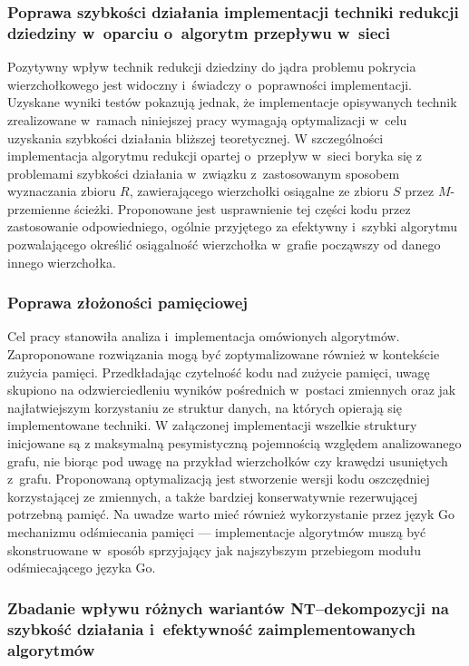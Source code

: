   \subsubsection{\textbf{Poprawa szybkości działania implementacji techniki redukcji dziedziny w~oparciu o~algorytm przepływu w~sieci}}

  Pozytywny wpływ technik redukcji dziedziny do jądra problemu pokrycia wierzchołkowego jest widoczny i~świadczy o~poprawności implementacji.
  Uzyskane wyniki testów pokazują jednak, że implementacje opisywanych technik zrealizowane w~ramach niniejszej pracy wymagają optymalizacji w~celu uzyskania szybkości działania bliższej teoretycznej.
  W szczególności implementacja algorytmu redukcji opartej o~przepływ w~sieci boryka się z problemami szybkości działania w~związku z~zastosowanym sposobem wyznaczania zbioru $R$, zawierającego wierzchołki osiągalne ze zbioru $S$ przez $M$-przemienne ścieżki.
  Proponowane jest usprawnienie tej części kodu przez zastosowanie odpowiedniego, ogólnie przyjętego za efektywny i~szybki algorytmu pozwalającego określić osiągalność wierzchołka w~grafie począwszy od danego innego wierzchołka.

  \subsubsection{\textbf{Poprawa złożoności pamięciowej}}

  Cel pracy stanowiła analiza i~implementacja omówionych algorytmów.
  Zaproponowane rozwiązania mogą być zoptymalizowane również w kontekście zużycia pamięci.
  Przedkładając czytelność kodu nad zużycie pamięci, uwagę skupiono na odzwierciedleniu wyników pośrednich w~postaci zmiennych oraz jak najłatwiejszym korzystaniu ze struktur danych, na których opierają się implementowane techniki.
  W załączonej implementacji wszelkie struktury inicjowane są z maksymalną pesymistyczną pojemnością względem analizowanego grafu, nie biorąc pod uwagę na przykład wierzchołków czy krawędzi usuniętych z~grafu.
  Proponowaną optymalizacją jest stworzenie wersji kodu oszczędniej korzystającej ze zmiennych, a także bardziej konserwatywnie rezerwującej potrzebną pamięć.
  Na uwadze warto mieć również wykorzystanie przez język Go mechanizmu odśmiecania pamięci --- implementacje algorytmów muszą być skonstruowane w~sposób sprzyjający jak najszybszym przebiegom modułu odśmiecającego języka Go.

  \subsubsection{\textbf{Zbadanie wpływu różnych wariantów NT--dekompozycji na szybkość działania i~efektywność zaimplementowanych algorytmów}}

